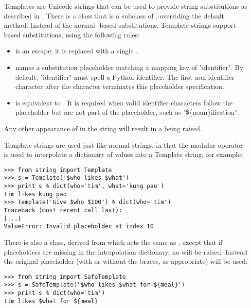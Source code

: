 Templates are Unicode strings that can be used to provide string substitutions
as described in .  There is a  class that is a
subclass of , overriding the default  method.
Instead of the normal \samp{\%}-based substitutions, Template strings support
\samp{\$}-based substitutions, using the following rules:

\begin{itemize}
\item \samp{\$\$} is an escape; it is replaced with a single \samp{\$}.

\item {} names a substitution placeholder matching a mapping
       key of "identifier".  By default, "identifier" must spell a Python
       identifier.  The first non-identifier character after the \samp{\$}
       character terminates this placeholder specification.

\item {} is equivalent to .  It is
      required when valid identifier characters follow the placeholder but are
      not part of the placeholder, such as "\$\{noun\}ification".
\end{itemize}

Any other appearance of \samp{\$} in the string will result in a
 being raised.


Template strings are used just like normal strings, in that the modulus
operator is used to interpolate a dictionary of values into a Template string,
for example:

\begin{verbatim}
>>> from string import Template
>>> s = Template('$who likes $what')
>>> print s % dict(who='tim', what='kung pao')
tim likes kung pao
>>> Template('Give $who $100') % dict(who='tim')
Traceback (most recent call last):
[...]
ValueError: Invalid placeholder at index 10
\end{verbatim}

There is also a  class, derived from 
which acts the same as , except that if placeholders are
missing in the interpolation dictionary, no  will be
raised.  Instead the original placeholder (with or without the braces, as
appropriate) will be used:

\begin{verbatim}
>>> from string import SafeTemplate
>>> s = SafeTemplate('$who likes $what for ${meal}')
>>> print s % dict(who='tim')
tim likes $what for ${meal}
\end{verbatim}

